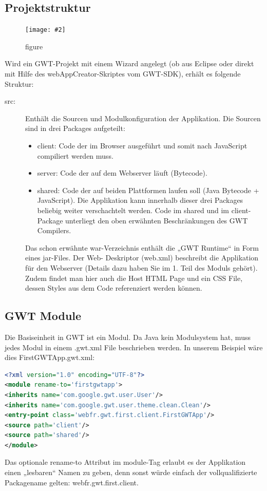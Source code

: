 \documentclass[a4paper,10pt]{scrreprt}
\newcommand{\pic}[2][figure]{\begin{figure}[h]
 \centering
 \texttt{[image: \#2]}
 \caption{#1}
\end{figure}
}
\begin{document}
\subsection{Projektstruktur}
\pic{gwtstruct.png}
Wird ein GWT-Projekt mit einem Wizard angelegt (ob aus Eclipse oder direkt mit Hilfe des
webAppCreator-Skriptes vom GWT-SDK), erhält es folgende Struktur:
\begin{description}
 \item[src:] Enthält die Sourcen und Modulkonfiguration
der Applikation. Die Sourcen sind in drei
Packages aufgeteilt:
\begin{itemize}
\item client: Code der im Browser ausgeführt und
somit nach JavaScript compiliert werden
muss.
\item server: Code der auf dem Webserver läuft
(Bytecode).
\item shared: Code der auf beiden Plattformen
laufen soll (Java Bytecode + JavaScript).
Die Applikation kann innerhalb dieser drei
Packages beliebig weiter verschachtelt werden.
Code im shared und im client-Package unterliegt
den oben erwähnten Beschränkungen des GWT
Compilers.
\end{itemize}
Das schon erwähnte war-Verzeichnis enthält die
„GWT Runtime“ in Form eines jar-Files. Der Web-
Deskriptor (web.xml) beschreibt die Applikation
für den Webserver (Details dazu haben Sie im 1.
Teil des Moduls gehört). Zudem findet man hier
auch die Host HTML Page und ein CSS File,
dessen Styles aus dem Code referenziert werden
können.
\end{description}

\subsection{GWT Module}
Die Basiseinheit in GWT ist ein Modul. Da Java kein Modulsystem hat, muss jedes Modul in
einem .gwt.xml File beschrieben werden. In unserem Beispiel wäre dies
FirstGWTApp.gwt.xml:
\begin{lstlisting}[caption=Modul Config GWT,language=xml]
 <?xml version="1.0" encoding="UTF-8"?>
<module rename-to='firstgwtapp'>
<inherits name='com.google.gwt.user.User'/>
<inherits name='com.google.gwt.user.theme.clean.Clean'/>
<entry-point class='webfr.gwt.first.client.FirstGWTApp'/>
<source path='client'/>
<source path='shared'/>
</module>
\end{lstlisting}
Das optionale rename-to Attribut im module-Tag erlaubt es der Applikation einen „lesbaren“
Namen zu geben, denn sonst würde einfach der vollqualifizierte Packagename gelten:
webfr.gwt.first.client.
\end{document}
